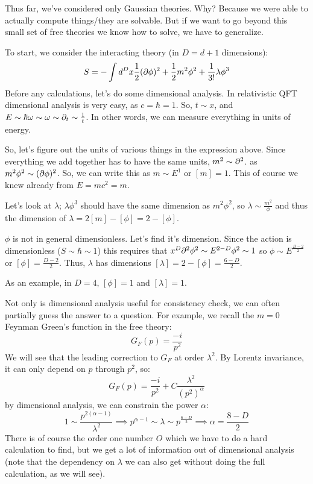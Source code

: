 Thus far, we've considered only Gaussian theories. Why? Because we were able to actually compute things/they are solvable. But if we want to go beyond this small set of free theories we know how to solve, we have to generalize.

To start, we consider the interacting theory (in $D = d + 1$ dimensions):
\begin{equation}
    S = -\int d^Dx \frac{1}{2}(\partial\phi)^2 + \frac{1}{2}m^2\phi^2 + \frac{1}{3!}\lambda \phi^3
\end{equation}
Before any calculations, let's do some dimensional analysis. In relativistic QFT dimensional analysis is very easy, as $c = \hbar = 1$. So, $t \sim x$, and $E \sim \hbar \omega \sim \omega \sim \partial_t \sim \frac{1}{t}$. In other words, we can measure everything in units of energy.

So, let's figure out the units of various things in the expression above. Since everything we add together has to have the same units, $m^2 \sim \partial^2$. as $m^2\phi^2 \sim (\partial\phi)^2$. So, we can write this as $m \sim E^1$ or $[m] = 1$. This of course we knew already from $E = mc^2 = m$. 

Let's look at $\lambda$; $\lambda \phi^3$ should have the same dimension as $m^2\phi^2$, so $\lambda \sim \frac{m^2}{\phi}$ and thus the dimension of $\lambda = 2[m] - [\phi] = 2-[\phi]$.

$\phi$ is not in general dimensionless. Let's find it's dimension. Since the action is dimensionless ($S \sim \hbar \sim 1$) this requires that $x^D \partial^2\phi^2 \sim E^{2-D}\phi^2 \sim 1$ so $\phi \sim E^{\frac{D-2}{2}}$ or $[\phi] = \frac{D - 2}{2}$. Thus, $\lambda$ has dimensions $[\lambda] = 2 - [\phi] = \frac{6-D}{2}$.

As an example, in $D = 4$, $[\phi] = 1$ and $[\lambda] = 1$.

Not only is dimensional analysis useful for consistency check, we can often partially guess the answer to a question. For example, we recall the $m = 0$ Feynman Green's function in the free theory:
\begin{equation}
    G_F(p) = \frac{-i}{p^2}
\end{equation}
We will see that the leading correction to $G_F$ at order $\lambda^2$. By Lorentz invariance, it can only depend on $p$ through $p^2$, so:
\begin{equation}
    G_F(p) =  \frac{-i}{p^2} + C\frac{\lambda^2}{(p^2)^{\alpha}}
\end{equation}
by dimensional analysis, we can constrain the power $\alpha$:
\begin{equation}
    1 \sim \frac{p^{2(\alpha-1)}}{\lambda^2} \implies p^{\alpha-1} \sim \lambda \sim p^{\frac{6-D}{2}} \implies \alpha = \frac{8-D}{2}
\end{equation}
There is of course the order one number $O$ which we have to do a hard calculation to find, but we get a lot of information out of dimensional analysis (note that the dependency on $\lambda$ we can also get without doing the full calculation, as we will see).

